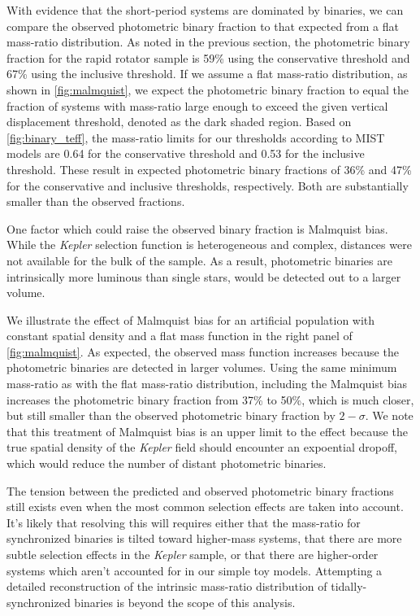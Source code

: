 \documentclass[twocolumn]{aastex6}
\newcommand{\Kepler}{\mbox{\textit{Kepler}}}
\begin{document}
With evidence that the short-period systems are dominated by binaries, we
can compare the observed photometric binary fraction to that expected from a
flat mass-ratio distribution. As noted in the previous section, the photometric
binary fraction for the rapid rotator sample is 59\% using the conservative
threshold and 67\% using the inclusive threshold. If we assume a flat
mass-ratio distribution, as shown in \cref{fig:malmquist}, we expect the 
photometric binary fraction to equal the fraction of systems with mass-ratio 
large enough to exceed the given vertical displacement threshold, denoted as
the dark shaded region. Based on \cref{fig:binary_teff}, the
mass-ratio limits for our thresholds according to MIST models are 0.64 for the
conservative threshold and 0.53 for the inclusive threshold. These result in
expected photometric binary fractions of 36\% and 47\% for the conservative and
inclusive thresholds, respectively. Both are substantially smaller than the
observed fractions. 

One factor which could raise the observed binary fraction is Malmquist bias. 
While the \Kepler{} selection function is heterogeneous and complex, distances
were not available for the bulk of the sample. As a result, photometric binaries 
are intrinsically more luminous than single stars, would be detected out to a
larger volume. 

We illustrate the effect of Malmquist bias for
an artificial population with constant spatial density and a flat mass
function in the right panel of \cref{fig:malmquist}. As expected, the observed
mass function increases because the photometric binaries are detected in larger
volumes. Using the same minimum mass-ratio as with the flat mass-ratio
distribution, including the Malmquist bias increases the photometric binary 
fraction from 37\% to 50\%, which is much closer, but still smaller than the 
observed photometric binary fraction by \(2-\sigma\). We note that this 
treatment of Malmquist bias is an upper limit to the effect because the true 
spatial density of the \Kepler{} field should encounter an expoential dropoff, 
which would reduce the number of distant photometric binaries.  

The tension between the predicted and observed photometric binary
fractions still exists even when the most common selection effects are taken into
account. It's likely that resolving this will requires either that the 
mass-ratio for synchronized binaries is tilted toward higher-mass systems, that 
there are more subtle selection effects in the \Kepler{} sample, or that
there are higher-order systems which aren't accounted for in our simple toy
models. Attempting a detailed reconstruction of the intrinsic 
mass-ratio distribution of tidally-synchronized binaries is beyond the scope 
of this analysis.
\end{document}
